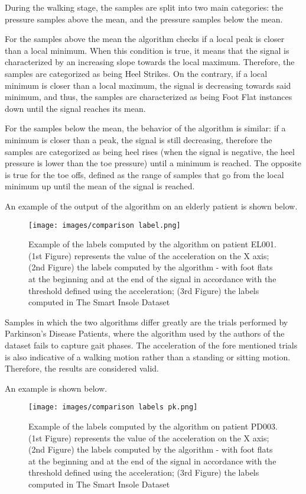 During the walking stage, the samples are split into two main categories: the pressure samples above the mean, and the pressure samples below the mean. 

For the samples above the mean the algorithm checks if a local peak is closer than a local minimum. When this condition is true, it means that the signal is characterized by an increasing slope towards the local maximum. Therefore, the samples are categorized as being Heel Strikes. On the contrary, if a local minimum is closer than a local maximum, the signal is decreasing towards said minimum, and thus, the samples are characterized as being Foot Flat instances down until the signal reaches its mean.

For the samples below the mean, the behavior of the algorithm is similar: if a minimum is closer than a peak, the signal is still decreasing, therefore the samples are categorized as being heel rises (when the signal is negative, the heel pressure is lower than the toe pressure) until a minimum is reached. The opposite is true for the toe offs, defined as the range of samples that go from the local minimum up until the mean of the signal is reached.

An example of the output of the algorithm on an elderly patient is shown below.


\begin{figure}[ht!]
    \centering
    \texttt{[image: images/comparison label.png]}
    \caption{Example of the labels computed by the algorithm on patient EL001. (1st Figure) represents the value of the acceleration on the X axis; (2nd Figure) the labels computed by the algorithm - with foot flats at the beginning and at the end of the signal in accordance with the threshold defined using the acceleration; (3rd Figure) the labels computed in The Smart Insole Dataset}
    \label{fig:Example of the labels computed by the algorithm on patient EL001.}
\end{figure}

Samples in which the two algorithms differ greatly are the trials performed by Parkinson's Disease Patients, where the algorithm used by the authors of the dataset fails to capture gait phases. The acceleration of the fore mentioned trials is also indicative of a walking motion rather than a standing or sitting motion. Therefore, the results are considered valid.

An example is shown below.

\begin{figure}[ht!]
    \centering
    \texttt{[image: images/comparison labels pk.png]}
    \caption{Example of the labels computed by the algorithm on patient PD003. (1st Figure) represents the value of the acceleration on the X axis; (2nd Figure) the labels computed by the algorithm - with foot flats at the beginning and at the end of the signal in accordance with the threshold defined using the acceleration; (3rd Figure) the labels computed in The Smart Insole Dataset}
    \label{fig:Example of the labels computed by the algorithm on patient PD003.}
\end{figure}


